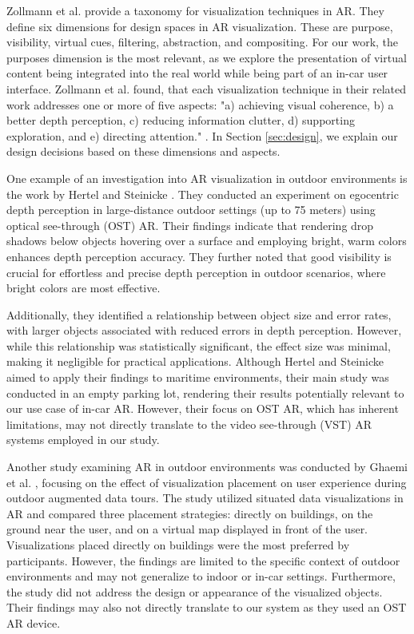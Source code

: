 Zollmann et al. \cite{Zollmann2021ArVisTechniques} provide a taxonomy for visualization techniques in AR. They define six dimensions for design spaces in AR visualization. These are purpose, visibility, virtual cues, filtering, abstraction, and compositing. For our work, the purposes dimension is the most relevant, as we explore the presentation of virtual content being integrated into the real world while being part of an in-car user interface. Zollmann et al. \cite{Zollmann2021ArVisTechniques} found, that each visualization technique in their related work addresses one or more of five aspects: "a) achieving visual coherence, b) a better depth perception, c) reducing information clutter, d) supporting exploration, and e) directing attention." \cite{Zollmann2021ArVisTechniques}. In Section \ref{sec:design}, we explain our design decisions based on these dimensions and aspects. 

One example of an investigation into AR visualization in outdoor environments is the work by Hertel and Steinicke \cite{SteinickeArMaritimePois2021}. They conducted an experiment on egocentric depth perception in large-distance outdoor settings (up to 75 meters) using optical see-through (OST) AR. Their findings indicate that rendering drop shadows below objects hovering over a surface and employing bright, warm colors enhances depth perception accuracy. They further noted that good visibility is crucial for effortless and precise depth perception in outdoor scenarios, where bright colors are most effective. 

Additionally, they identified a relationship between object size and error rates, with larger objects associated with reduced errors in depth perception. However, while this relationship was statistically significant, the effect size was minimal, making it negligible for practical applications. Although Hertel and Steinicke \cite{SteinickeArMaritimePois2021} aimed to apply their findings to maritime environments, their main study was conducted in an empty parking lot, rendering their results potentially relevant to our use case of in-car AR. However, their focus on OST AR, which has inherent limitations, may not directly translate to the video see-through (VST) AR systems employed in our study.

Another study examining AR in outdoor environments was conducted by Ghaemi et al. \cite{Ghaemi23ARPlacement}, focusing on the effect of visualization placement on user experience during outdoor augmented data tours. The study utilized situated data visualizations in AR and compared three placement strategies: directly on buildings, on the ground near the user, and on a virtual map displayed in front of the user. Visualizations placed directly on buildings were the most preferred by participants. However, the findings are limited to the specific context of outdoor environments and may not generalize to indoor or in-car settings. Furthermore, the study did not address the design or appearance of the visualized objects. Their findings may also not directly translate to our system as they used an OST AR device.

